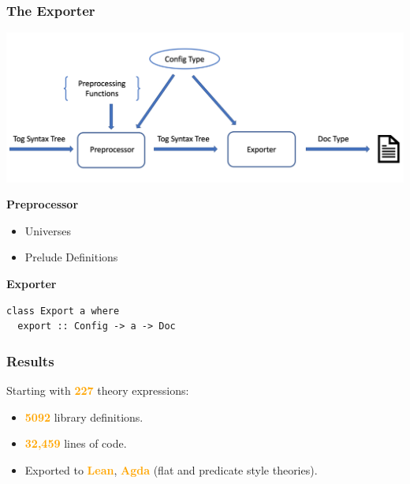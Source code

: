 \documentclass[t,10pt,numbers,fleqn,usenames,xcolor=dvipsnames]{beamer}
\begin{document}
\begin{frame}[fragile] 
\frametitle{The Exporter} 
\includegraphics[scale=0.2]{../figures/exporter_arch.png}
\begin{overprint}
\textbf{Preprocessor}
\begin{itemize}
\item Universes 
\item Prelude Definitions 
\end{itemize}
\textbf{Exporter}
\begin{verbatim} 
class Export a where
  export :: Config -> a -> Doc
\end{verbatim} 
\end{overprint}
\end{frame}

\begin{frame}[fragile] 
\frametitle{Results}
Starting with \textbf{\textcolor{Orange}{227}} theory expressions:
\begin{itemize}
\item \textcolor{Orange}{\textbf{5092}} library definitions. 
\item \textcolor{Orange}{\textbf{32,459}} lines of code. 
\item Exported to \textcolor{Orange}{\textbf{Lean}}, \textcolor{Orange}{\textbf{Agda}} (flat and predicate style theories).
\end{itemize}
\end{frame}
\end{document}
